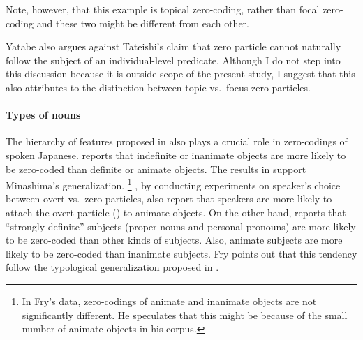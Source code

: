 Note, however, that this example is topical zero-coding,
rather than focal zero-coding and
these two might be different from each other.

Yatabe also argues against Tateishi's claim that
zero particle cannot naturally follow
the subject of an individual-level predicate.
Although I do not step into this discussion
because it is outside scope of the present study,
I suggest that this also attributes to
the distinction between topic vs.~focus zero particles.
%


\paragraph{Types of nouns}

The hierarchy of features proposed in 
also plays a crucial role in zero-codings of spoken Japanese.
 reports that
indefinite or inanimate objects are more likely to be zero-coded
than definite or animate objects.
The results in  support Minashima's generalization.%
 \footnote{
 In Fry's data, zero-codings of animate and inanimate objects are not
 significantly different.
 He speculates that this might be because of the small number of
 animate objects in his corpus.
 }
, by conducting experiments on speaker's choice between overt vs.~zero particles,
also report that speakers are more likely to attach the overt particle () to animate objects.
On the other hand,
 reports that
``strongly definite'' subjects (proper nouns and personal pronouns)
are more likely to be zero-coded than other kinds of subjects.
Also, animate subjects are more likely to be zero-coded than
inanimate subjects.
Fry points out that this tendency follow the typological generalization
proposed in .

